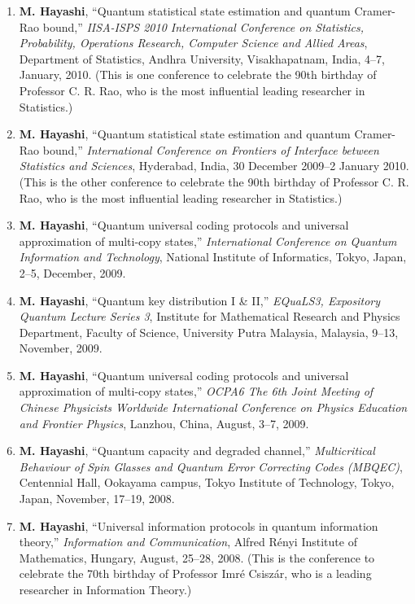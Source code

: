 \documentclass[a4paper,12pt,oneside]{article}
\begin{document}
\begin{enumerate}
\item 
\textbf{M. Hayashi}, 
``Quantum statistical state estimation and quantum Cramer-Rao bound,'' 
{\em IISA-ISPS 2010 International Conference on Statistics, Probability, Operations Research, Computer Science and Allied Areas}, 
Department of Statistics, Andhra University, Visakhapatnam, India, 4--7, January, 2010.
(This is one conference to celebrate the 90th birthday of Professor C. R. Rao,
who is the most influential leading researcher in Statistics.)

\item 
\textbf{M. Hayashi}, 
``Quantum statistical state estimation and quantum Cramer-Rao bound,'' 
{\em International Conference on Frontiers of Interface between Statistics and Sciences}, 
Hyderabad, India, 30 December 2009--2 January 2010.
(This is the other conference to celebrate the 90th birthday of Professor C. R. Rao,
who is the most influential leading researcher in Statistics.)


\item 
\textbf{M. Hayashi}, 
``Quantum universal coding protocols and universal approximation of multi-copy states,'' 
{\em International Conference on Quantum Information and Technology}, 
National Institute of Informatics, Tokyo, Japan, 2--5, December, 2009.

\item 
\textbf{M. Hayashi}, 
``Quantum key distribution I \& II,'' 
{\em EQuaLS3, Expository Quantum Lecture Series 3}, 
Institute for Mathematical Research and Physics Department, Faculty of Science, University Putra Malaysia, Malaysia, 9--13, November, 2009.

\item 
\textbf{M. Hayashi}, 
``Quantum universal coding protocols and universal approximation of multi-copy states,'' 
{\em OCPA6 The 6th Joint Meeting of Chinese Physicists Worldwide International Conference on Physics Education and Frontier Physics}, 
Lanzhou, China, August, 3--7, 2009.

\item 
\textbf{M. Hayashi}, ``Quantum capacity and degraded channel,'' 
{\em Multicritical Behaviour of Spin Glasses and Quantum Error Correcting Codes (MBQEC)}, 
Centennial Hall, Ookayama campus, Tokyo Institute of Technology, Tokyo, Japan, November, 17--19, 2008.

\item 
\textbf{M. Hayashi}, ``Universal information protocols in quantum information theory,'' 
{\em Information and Communication}, 
Alfred R\'{e}nyi Institute of Mathematics, Hungary, August, 25--28, 2008.
(This is the conference 
to celebrate the 70th birthday of Professor Imr\'{e} Csisz\'{a}r,
who is a leading researcher in Information Theory.)


\end{enumerate}
\end{document}
